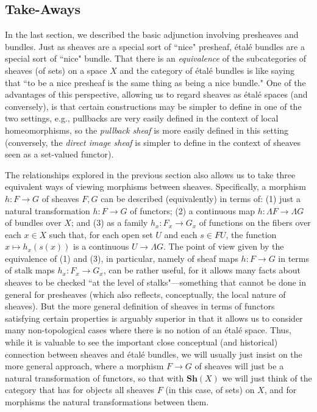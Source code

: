 \documentclass[a4paper]{book}
\theoremstyle{definition}
\theoremstyle{definition}
\theoremstyle{definition}
\theoremstyle{theorem}
\theoremstyle{definition}
\begin{document}
\subsection{Take-Aways}
In the last section, we described the basic adjunction involving presheaves and bundles. Just as sheaves are a special sort of ``nice" presheaf, \'etal\'e bundles are a special sort of ``nice" bundle. That there is an \textit{equivalence} of the subcategories of sheaves (of sets) on a space $X$ and the category of \'etal\'e bundles is like saying that ``to be a nice presheaf is the same thing as being a nice bundle." One of the advantages of this perspective, allowing us to regard sheaves as \'etal\'e spaces (and conversely), is that certain constructions may be simpler to define in one of the two settings, e.g., pullbacks are very easily defined in the context of local homeomorphisms, so the \textit{pullback sheaf} is more easily defined in this setting (conversely, the \textit{direct image sheaf} is simpler to define in the context of sheaves seen as a set-valued functor). \par 
The relationships explored in the previous section also allows us to take three equivalent ways of viewing morphisms between sheaves. Specifically, a morphism $h: F \rightarrow G$ of sheaves $F, G$ can be described (equivalently) in terms of: (1) just a natural transformation $h: F \rightarrow G$ of functors; (2) a continuous map $h: \Lambda F \rightarrow \Lambda G$ of bundles over $X$; and (3) as a family $h_x: F_x \rightarrow G_x$ of functions on the fibers over each $x \in X$ such that, for each open set $U$ and each $s \in FU$, the function $x \mapsto h_x(s(x))$ is a continuous $U \rightarrow \Lambda G$. The point of view given by the equivalence of (1) and (3), in particular, namely of sheaf maps $h: F \rightarrow G$ in terms of stalk maps $h_x: F_x \rightarrow G_x$, can be rather useful, for it allows many facts about sheaves to be checked ``at the level of stalks"---something that cannot be done in general for presheaves (which also reflects, conceptually, the local nature of sheaves). But the more general definition of sheaves in terms of functors satisfying certain properties is arguably superior in that it allows us to consider many non-topological cases where there is no notion of an \'etal\'e space. Thus, while it is valuable to see the important close conceptual (and historical) connection between sheaves and \'etal\'e bundles, we will usually just insist on the more general approach, where a morphism $F \rightarrow G$ of sheaves will just be a natural transformation of functors, so that with $\textbf{Sh}(X)$ we will just think of the category that has for objects all sheaves $F$ (in this case, of sets) on $X$, and for morphisms the natural transformations between them. \par
\end{document}
